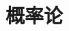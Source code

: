 \documentclass[12pt, a4paper, oneside, UTF8]{ctexbook}
\begin{document}
\else
\fi
\chapter{概率论}

\ifx\allfiles\undefined
\end{document}
